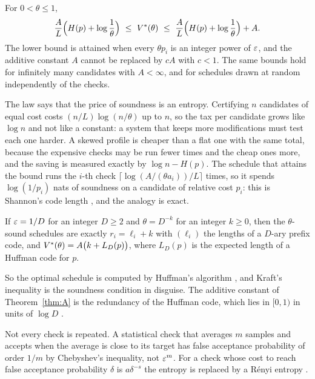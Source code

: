 \begin{mainthm}\label{thm:A}
For $0<\theta\le1$,
\begin{equation}\label{eq:entropylaw}
\frac{A}{L}\Bigl(H(p)+\log\frac1\theta\Bigr)\ \le\ \Vs(\theta)\ \le\ \frac{A}{L}\Bigl(H(p)+\log\frac1\theta\Bigr)+A .
\end{equation}
The lower bound is attained when every $\theta p_{i}$ is an integer power of $\varepsilon$, and the additive constant $A$ cannot be replaced by $cA$ with $c<1$. The same bounds hold for infinitely many candidates with $A<\infty$, and for schedules drawn at random independently of the checks.
\end{mainthm}

The law says that the price of soundness is an entropy. Certifying $n$ candidates of equal cost costs $(n/L)\log(n/\theta)$ up to $n$, so the tax per candidate grows like $\log n$ and not like a constant: a system that keeps more modifications must test each one harder. A skewed profile is cheaper than a flat one with the same total, because the expensive checks may be run fewer times and the cheap ones more, and the saving is measured exactly by $\log n-H(p)$. The schedule that attains the bound runs the $i$-th check $\lceil\log(A/(\theta a_{i}))/L\rceil$ times, so it spends $\log(1/p_{i})$ nats of soundness on a candidate of relative cost $p_{i}$: this is Shannon's code length \cite{Sha48}, and the analogy is exact.

\begin{mainthm}\label{thm:C}
If $\varepsilon=1/D$ for an integer $D\ge2$ and $\theta=D^{-k}$ for an integer $k\ge0$, then the $\theta$-sound schedules are exactly $r_{i}=\ell_{i}+k$ with $(\ell_{i})$ the lengths of a $D$-ary prefix code, and $V^{*}(\theta)=A\bigl(k+L_{D}(p)\bigr)$, where $L_{D}(p)$ is the expected length of a Huffman code for $p$.
\end{mainthm}

So the optimal schedule is computed by Huffman's algorithm \cite{Huf52}, and Kraft's inequality \cite{Kra49,McM56} is the soundness condition in disguise. The additive constant of Theorem~\ref{thm:A} is the redundancy of the Huffman code, which lies in $[0,1)$ in units of $\log D$ \cite{CT06,Gal78}.

Not every check is repeated. A statistical check that averages $m$ samples and accepts when the average is close to its target has false acceptance probability of order $1/m$ by Chebyshev's inequality, not $\varepsilon^{m}$. For a check whose cost to reach false acceptance probability $\delta$ is $a\delta^{-s}$ the entropy is replaced by a R\'enyi entropy \cite{Ren61}.

